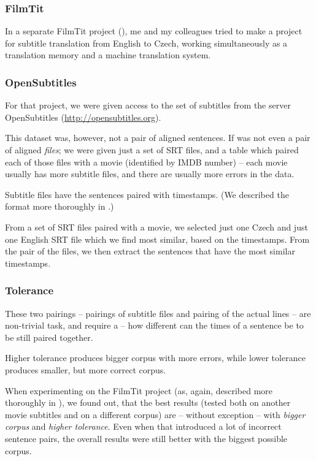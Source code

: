 \subsubsection{FilmTit}

In a separate FilmTit project (\cite{filmtit}), me and my colleagues  tried to make a project for subtitle translation from English to Czech, working simultaneously as a translation memory and a machine translation system.
\subsubsection{OpenSubtitles}

For that project, we were given access to the set of subtitles from the server OpenSubtitles (\url{http://opensubtitles.org}). 

This dataset was, however, not a pair of aligned sentences. If was not even a pair of aligned \emph{files}; we were given just a set of SRT files, and a table which paired each of those files with a movie (identified by IMDB number) -- each movie usually has more subtitle files, and there are usually more errors in the data. 

Subtitle files have the sentences paired with timestamps. (We described the format more thoroughly in \cite{filmtit}.)

From a set of SRT files paired with a movie, we selected just one Czech and just one English SRT file which we find most similar, based on the timestamps.
From the pair of the files, we then extract the sentences that have the most similar timestamps.
\subsubsection{Tolerance}

These two pairings -- pairings of subtitle files and pairing of the actual lines -- are non-trivial task, and require a  -- how different can the times of a sentence be to be still paired together.

Higher tolerance produces bigger corpus with more errors, while lower tolerance produces smaller, but more correct corpus.

When  experimenting on the FilmTit project (as, again, described more thoroughly in \cite{filmtit}), we found out, that the best results (tested both on another movie subtitles and on a different corpus) are -- without exception -- with \emph{bigger corpus} and \emph{higher tolerance}. Even when that introduced a lot of incorrect sentence pairs, the overall results were still better with the biggest possible corpus.
